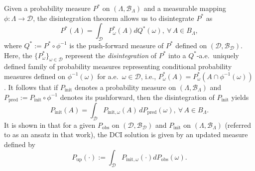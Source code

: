 \documentclass{article}
\newcommand{\B}{\mathcal{B}}
\newcommand{\pspace}{\Lambda}
\newcommand{\dspace}{\mathcal{D}}
\newcommand{\initmeas}{P_{\text{init}}}
\newcommand{\initmeasomega}{P_{\text{init}, \omega}}
\newcommand{\predictmeas}{P_\text{pred}}
\begin{document}
Given a probability measure $P^*$ on $(\Lambda,\B_{\Lambda})$ and a measurable mapping $\phi: \Lambda \rightarrow \mathcal{D}$, the disintegration theorem \cite{changandpollard1997} allows us to disintegrate $P^*$ as
\begin{equation} \label{disintegration}
    P^*(A) = \int_{\mathcal{D}}P^*_{\omega}(A) dQ^{*}(\omega), \ \forall \, A\in B_\Lambda,
\end{equation}
where $Q^{*}:= P^{*}\circ\phi^{-1}$ is the push-forward measure of $P^*$ defined on $(\dspace, \B_\dspace)$.
Here, the $\{P^*_\omega\}_{\omega \in \mathcal{D}}$ represent the {\em disintegration} of $P^*$ into a $Q^*$-a.e.~uniquely defined family of probability measures representing conditional probability measures defined on $\phi^{-1}(\omega)$ for a.e.~$\omega\in\mathcal{D}$, i.e., $P^*_\omega(A) = P^*_\omega(A\cap \phi^{-1}(\omega))$.
It follows that if $\initmeas$ denotes a probability measure on $(\Lambda,\B_\Lambda)$ and $\predictmeas:=\initmeas\circ \phi^{-1}$ denotes its pushforward, then the disintegration of $\initmeas$ yields
\begin{equation}\label{eq:disintegrate_initial}
    \initmeas(A) = \int_\dspace \initmeasomega(A)\, d\predictmeas(\omega), \ \forall \, A\in B_\pspace.
\end{equation}
It is shown in \cite{BET+14} that for a given $P_\text{obs}$ on $(\mathcal{D},\B_\mathcal{D})$ and $P_\text{init}$ on $(\Lambda,\B_\Lambda)$ (referred to as an ansatz in that work), the DCI solution is given by an updated measure defined by
\begin{equation} \label{integration}
    P_\text{up}(\cdot) := \int_{\mathcal{D}} P_{\text{init}, \omega}(\cdot) dP_\text{obs}(\omega).
\end{equation}
\end{document}
